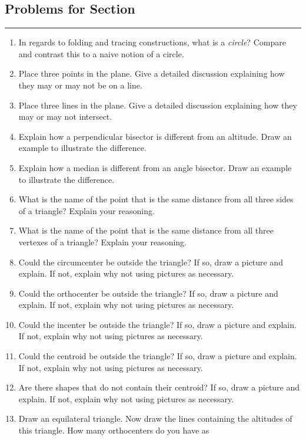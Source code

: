 \newpage



\subsection*{Problems for Section~\thesection}\hrule\vspace{1ex}
\begin{enumerate}
\item In regards to folding and tracing constructions, what is a \textit{circle}?
  Compare and contrast this to a naive notion of a circle.
\item Place three points in the plane. Give a detailed discussion
  explaining how they may or may not be on a line.
\item Place three lines in the plane. Give a detailed discussion explaining
  how they may or may not intersect.
\item Explain how a perpendicular bisector is different from an
  altitude. Draw an example to illustrate the difference.
\item Explain how a median is different from an angle bisector.  Draw an
  example to illustrate the difference.
\item What is the name of the point that is the same distance from all
  three sides of a triangle? Explain your reasoning.
\item What is the name of the point that is the same distance from all
  three vertexes of a triangle? Explain your reasoning.
\item Could the circumcenter be outside the triangle? If so, draw a
  picture and explain. If not, explain why not using pictures as
  necessary.
\item Could the orthocenter be outside the triangle? If so, draw a
  picture and explain. If not, explain why not using pictures as
  necessary.
\item Could the incenter be outside the triangle? If so, draw a
  picture and explain. If not, explain why not using pictures as
  necessary.
\item Could the centroid be outside the triangle? If so, draw a
  picture and explain. If not, explain why not using pictures as
  necessary.
\item Are there shapes that do not contain their centroid? If so, draw
  a picture and explain. If not, explain why not using pictures as
  necessary.
\item Draw an equilateral triangle. Now draw the lines containing the
  altitudes of this triangle. How many orthocenters do you have as

\end{enumerate}
